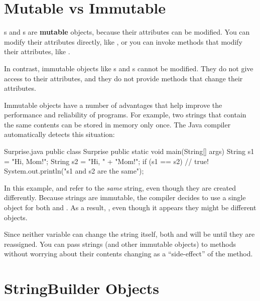 \section{Mutable vs Immutable}


s and s are {\bf mutable} objects, because their attributes can be modified.
You can modify their attributes directly, like , or you can invoke methods that modify their attributes, like .

In contrast, immutable objects like s and s cannot be modified.
They do not give  access to their attributes, and they do not provide methods that change their attributes.

Immutable objects have a number of advantages that help improve the performance and reliability of programs.
For example, two strings that contain the same contents can be stored in memory only once.
The Java compiler automatically detects this situation:


\begin{trinket}[265]{Surprise.java}
public class Surprise {
    public static void main(String[] args) {
        String s1 = "Hi, Mom!";
        String s2 = "Hi, " + "Mom!";
        if (s1 == s2) {                // true!
            System.out.println("s1 and s2 are the same");
        }
    }
}
\end{trinket}

In this example,  and  refer to the {\em same} string, even though they are created differently.
Because strings are immutable, the compiler decides to use a single object for both  and .
As a result, , even though it appears they might be different objects.

Since neither variable can change the string itself, both  and  will be  until they are reassigned.
You can pass strings (and other immutable objects) to methods without worrying about their contents changing as a ``side-effect'' of the method.


\section{StringBuilder Objects}


